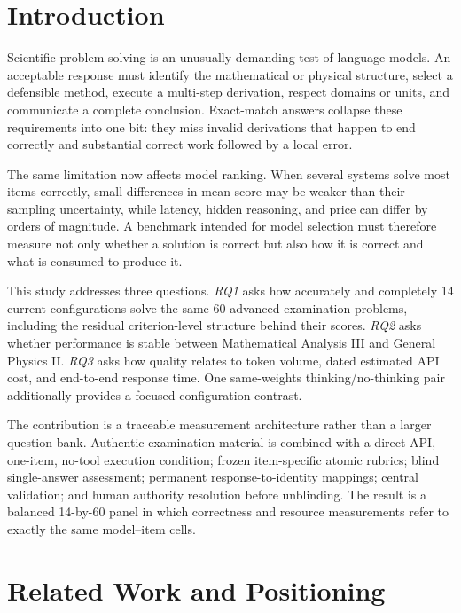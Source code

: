\documentclass[11pt,a4paper,twocolumn]{article}
\begin{document}
\section{Introduction}

Scientific problem solving is an unusually demanding test of language models.
An acceptable response must identify the mathematical or physical structure,
select a defensible method, execute a multi-step derivation, respect domains or
units, and communicate a complete conclusion. Exact-match answers collapse
these requirements into one bit: they miss invalid derivations that happen to
end correctly and substantial correct work followed by a local error.

The same limitation now affects model ranking. When several systems solve most
items correctly, small differences in mean score may be weaker than their
sampling uncertainty, while latency, hidden reasoning, and price can differ by
orders of magnitude. A benchmark intended for model selection must therefore
measure not only whether a solution is correct but also how it is correct and
what is consumed to produce it.

This study addresses three questions. \emph{RQ1} asks how accurately and
completely 14 current configurations solve the same 60 advanced examination
problems, including the residual criterion-level structure behind their
scores. \emph{RQ2} asks whether performance is stable between Mathematical
Analysis III and General Physics II. \emph{RQ3} asks how quality relates to
token volume, dated estimated API cost, and end-to-end response time. One
same-weights thinking/no-thinking pair additionally provides a focused
configuration contrast.

The contribution is a traceable measurement architecture rather than a larger
question bank. Authentic examination material is combined with a direct-API,
one-item, no-tool execution condition; frozen item-specific atomic rubrics;
blind single-answer assessment; permanent response-to-identity mappings;
central validation; and human authority resolution before unblinding. The
result is a balanced 14-by-60 panel in which correctness and resource
measurements refer to exactly the same model--item cells.

\section{Related Work and Positioning}\label{sec:related-work}
\end{document}
